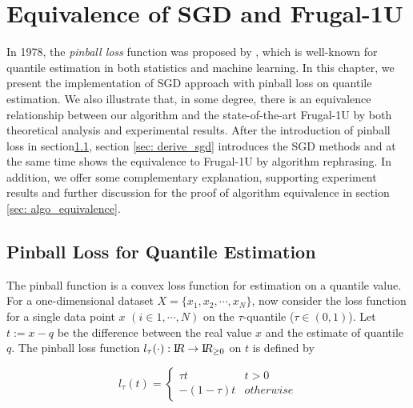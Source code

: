 \chapter{Equivalence of SGD and Frugal-1U}
\label{ch: algo_equal}

\graphicspath{{Figures/Frugal_SGD/}{./}} 

           
In 1978, the \textit{pinball loss} function was proposed by \citeauthor{koenkerRegressionQuantiles1978}\cite{koenkerRegressionQuantiles1978}, which is well-known for quantile estimation in both statistics and machine learning. In this chapter, we present the implementation of SGD approach with pinball loss on quantile estimation. We also illustrate that, in some degree, there is an equivalence relationship between our algorithm and the state-of-the-art Frugal-1U\cite{maFrugalStreamingEstimating2014} by both theoretical analysis and experimental results. After the introduction of pinball loss in section\ref{sec: pinball_loss}, section \ref{sec: derive_sgd} introduces the SGD methods and at the same time shows the equivalence to Frugal-1U by algorithm rephrasing. In addition, we offer some complementary explanation, supporting experiment results and further discussion for the proof of algorithm equivalence in section \ref{sec: algo_equivalence}.

\section{Pinball Loss for Quantile Estimation}
\label{sec: pinball_loss}
The pinball function is a convex loss function for estimation on a quantile value.
For a one-dimensional dataset $X = \{x_1, x_2, \cdots, x_N\}$, 
now consider the loss function for a single data point $x$ $(i \in {1, \cdots, N})$ on the $\tau$-quantile ($\tau \in (0,1)$).
Let $t := x - q$ be the difference between the real value $x$ and the estimate of quantile $q$.
The pinball loss function $l_{\tau}(\cdot): \mathrm I\!R \to \mathrm I\!R_{\geq 0}$ on $t$ is defined by

\begin{equation}
    l_\tau(t)= 
        \begin{cases}
            \tau t & t > 0\\
            -(1-\tau) t & otherwise
        \end{cases}
\end{equation}


